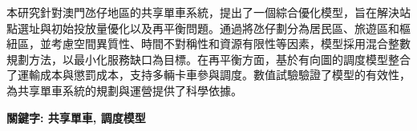 本研究針對澳門氹仔地區的共享單車系統，提出了一個綜合優化模型，旨在解決站點選址與初始投放量優化以及再平衡問題。通過將氹仔劃分為居民區、旅遊區和樞紐區，並考慮空間異質性、時間不對稱性和資源有限性等因素，模型採用混合整數規劃方法，以最小化服務缺口為目標。在再平衡方面，基於有向圖的調度模型整合了運輸成本與懲罰成本，支持多輛卡車參與調度。數值試驗驗證了模型的有效性，為共享單車系統的規劃與運營提供了科學依據。

\begin{center}
    \textbf{關鍵字: 共享單車, 調度模型}
\end{center}

